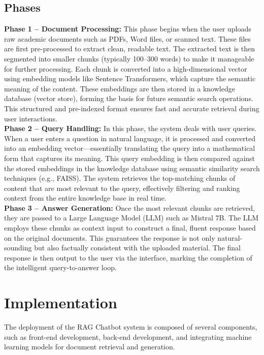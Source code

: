 \documentclass[12pt]{report}
\begin{document}
\section{Phases}
\textbf{Phase 1 – Document Processing:}
This phase begins when the user uploads raw academic documents such as PDFs, Word files, or scanned text. These files are first pre-processed to extract clean, readable text. The extracted text is then segmented into smaller chunks (typically 100–300 words) to make it manageable for further processing. Each chunk is converted into a high-dimensional vector using embedding models like Sentence Transformers, which capture the semantic meaning of the content. These embeddings are then stored in a knowledge database (vector store), forming the basis for future semantic search operations. This structured and pre-indexed format ensures fast and accurate retrieval during user interactions.
\\
\newline
\textbf{Phase 2 – Query Handling:}
In this phase, the system deals with user queries. When a user enters a question in natural language, it is processed and converted into an embedding vector—essentially translating the query into a mathematical form that captures its meaning. This query embedding is then compared against the stored embeddings in the knowledge database using semantic similarity search techniques (e.g., FAISS). The system retrieves the top-matching chunks of content that are most relevant to the query, effectively filtering and ranking context from the entire knowledge base in real time.
\\
\newline
\textbf{Phase 3 – Answer Generation:}
Once the most relevant chunks are retrieved, they are passed to a Large Language Model (LLM) such as Mistral 7B. The LLM employs these chunks as context input to construct a final, fluent response based on the original documents. This guarantees the response is not only natural-sounding but also factually consistent with the uploaded material. The final response is then output to the user via the interface, marking the completion of the intelligent query-to-answer loop.


\chapter{Implementation}
The deployment of the RAG Chatbot system is composed of several components, such as front-end development, back-end development, and integrating machine learning models for document retrieval and generation.
\end{document}
